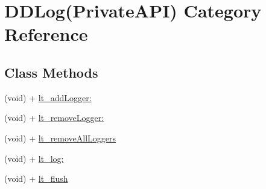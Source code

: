 \hypertarget{category_d_d_log_07_private_a_p_i_08}{\section{D\-D\-Log(Private\-A\-P\-I) Category Reference}
\label{category_d_d_log_07_private_a_p_i_08}
}
\subsection*{Class Methods}
\begin{DoxyCompactItemize}
\item 
(void) + \hyperlink{category_d_d_log_07_private_a_p_i_08_a781b8cd2f6d7ec37ed97af984d6d35d3}{lt\-\_\-add\-Logger\-:}
\item 
(void) + \hyperlink{category_d_d_log_07_private_a_p_i_08_a932ea29502079f379c14764a1a2f4ba6}{lt\-\_\-remove\-Logger\-:}
\item 
(void) + \hyperlink{category_d_d_log_07_private_a_p_i_08_a62d90e6f42f737bcbf54d3685dfb450e}{lt\-\_\-remove\-All\-Loggers}
\item 
(void) + \hyperlink{category_d_d_log_07_private_a_p_i_08_ab7c725d7fcee35d3d5b28ff46743109d}{lt\-\_\-log\-:}
\item 
(void) + \hyperlink{category_d_d_log_07_private_a_p_i_08_a2a090fd990e2d856a4d107d070f3b569}{lt\-\_\-flush}
\end{DoxyCompactItemize}


